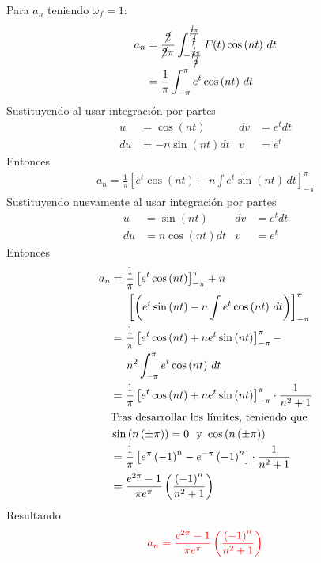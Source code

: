\begin{multicols}{2}
Para $a_n$ teniendo $\omega_f = 1$:
\begin{align*}
    a_n &= \frac{\cancel{2}}{\cancel{2}\pi} \int_{-\frac{\cancel{2}\pi}{\cancel{2}}}^{\frac{\cancel{2}\pi}{\cancel{2}}} F(t) \cos\left(nt\right) \,dt\\
    &= \frac{1}{\pi} \int_{-\pi}^{\pi} e^{t} \cos\left(nt\right) \,dt
\end{align*}
Sustituyendo al usar integración por partes
\begin{align*}
    u&=\cos\left(nt\right)           &  dv&=e^{t} dt\\
    du&=-n\sin\left(nt\right)dt         &  v&=e^{t}
\end{align*}
Entonces
\begin{align*}
    a_n = \frac{1}{\pi} \left[e^{t} \cos\left(nt\right) + n\int e^{t} \sin\left(nt\right) \,dt\right]_{-\pi}^{\pi}
\end{align*}
Sustituyendo nuevamente al usar integración por partes
\begin{align*}
    u&=\sin\left(nt\right)           &  dv&=e^{t} dt\\
    du&=n\cos\left(nt\right)dt         &  v&=e^{t}
\end{align*}
Entonces
\begin{align*}
    a_n &= \frac{1}{\pi} \left[e^{t} \cos\left(nt\right)\right]_{-\pi}^{\pi} +n\\
    &\hphantom{=}~~ \left[\left(e^{t} \sin\left(nt\right) - n\int e^{t} \cos\left(nt\right) \,dt\right)\right]_{-\pi}^{\pi}\\
    &= \frac{1}{\pi} \left[e^{t} \cos\left(nt\right) + ne^{t}\sin\left(nt\right)\right]_{-\pi}^{\pi} -\\
    &\hphantom{=}~~ n^{2}\int_{-\pi}^{\pi} e^{t} \cos\left(nt\right) \,dt\\
    &= \frac{1}{\pi} \left[e^{t} \cos\left(nt\right) + ne^{t} \sin\left(nt\right)\right]_{-\pi}^{\pi} \cdot \frac{1}{n^{2}+1}\\
    &\textup{Tras desarrollar los límites, teniendo que }\\
    &\sin\left(n\left(\pm \pi\right)\right) = 0~~\mathrm{y}~\cos\left(n\left(\pm \pi\right)\right)\\
    &= \frac{1}{\pi} \left[e^{\pi}\left(-1\right)^{n}-e^{-\pi}\left(-1\right)^{n}\right] \cdot \frac{1}{n^{2}+1}\\
    &= \frac{e^{2\pi}-1}{\pi e^{\pi}} \left(\frac{\left(-1\right)^{n}}{n^{2}+1}\right)
\end{align*}
Resultando
\begin{equation}
    \textcolor{rojo}{a_n = \frac{e^{2\pi}-1}{\pi e^{\pi}} \left(\frac{\left(-1\right)^{n}}{n^{2}+1}\right)}
    \label{res:23}
\end{equation}


\end{multicols}
